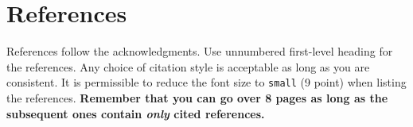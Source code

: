 \documentclass{article}
\begin{document}
\section*{References}

References follow the acknowledgments. Use unnumbered first-level
heading for the references. Any choice of citation style is acceptable
as long as you are consistent. It is permissible to reduce the font
size to \verb+small+ (9 point) when listing the references. {\bf
  Remember that you can go over 8 pages as long as the subsequent ones contain
  \emph{only} cited references.}
\medskip

\small

\clearpage
\newpage


\end{document}
